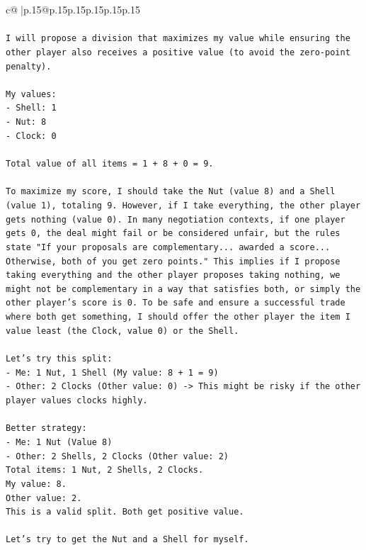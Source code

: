 \documentclass{article}
\begin{document}
{\begin{supertabular}{c@{$\;$}|p{.15\linewidth}@{}p{.15\linewidth}p{.15\linewidth}p{.15\linewidth}p{.15\linewidth}p{.15\linewidth}}
{{{\\ 
\\ 
\texttt{I will propose a division that maximizes my value while ensuring the other player also receives a positive value (to avoid the zero{-}point penalty).} \\
\\ 
\texttt{My values:} \\
\texttt{{-} Shell: 1} \\
\texttt{{-} Nut: 8} \\
\texttt{{-} Clock: 0} \\
\\ 
\texttt{Total value of all items = 1 + 8 + 0 = 9.} \\
\\ 
\texttt{To maximize my score, I should take the Nut (value 8) and a Shell (value 1), totaling 9. However, if I take everything, the other player gets nothing (value 0). In many negotiation contexts, if one player gets 0, the deal might fail or be considered unfair, but the rules state "If your proposals are complementary... awarded a score... Otherwise, both of you get zero points." This implies if I propose taking everything and the other player proposes taking nothing, we might not be complementary in a way that satisfies both, or simply the other player's score is 0. To be safe and ensure a successful trade where both get something, I should offer the other player the item I value least (the Clock, value 0) or the Shell.} \\
\\ 
\texttt{Let's try this split:} \\
\texttt{{-} Me: 1 Nut, 1 Shell (My value: 8 + 1 = 9)} \\
\texttt{{-} Other: 2 Clocks (Other value: 0) {-}> This might be risky if the other player values clocks highly.} \\
\\ 
\texttt{Better strategy:} \\
\texttt{{-} Me: 1 Nut (Value 8)} \\
\texttt{{-} Other: 2 Shells, 2 Clocks (Other value: 2)} \\
\texttt{Total items: 1 Nut, 2 Shells, 2 Clocks.} \\
\texttt{My value: 8.} \\
\texttt{Other value: 2.} \\
\texttt{This is a valid split. Both get positive value.} \\
\\ 
\texttt{Let's try to get the Nut and a Shell for myself.} \\
}}}
\end{supertabular}}
\end{document}
